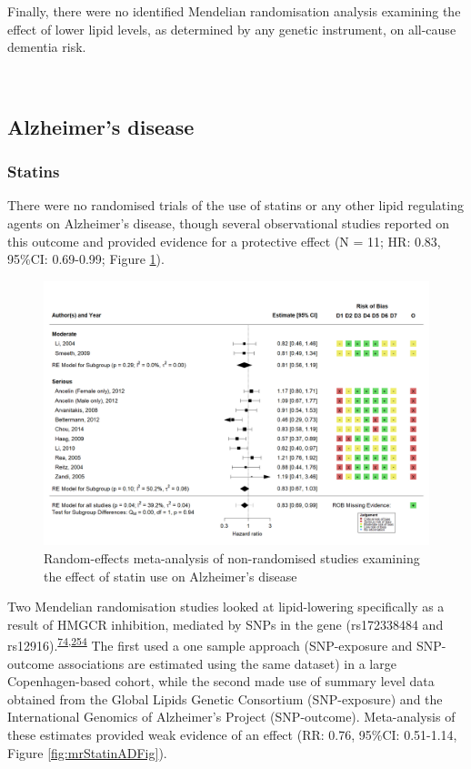 \documentclass[a4paper, twoside]{templates/ociamthesis}
\begin{document}
Finally, there were no identified Mendelian randomisation analysis examining the effect of lower lipid levels, as determined by any genetic instrument, on all-cause dementia risk.

~

\hypertarget{sys-rev-res-AD}{%
\subsection{Alzheimer's disease}\label{sys-rev-res-AD}}

\hypertarget{statins-1}{%
\subsubsection{Statins}\label{statins-1}}

There were no randomised trials of the use of statins or any other lipid regulating agents on Alzheimer's disease, though several observational studies reported on this outcome and provided evidence for a protective effect (N = 11; HR: 0.83, 95\%CI: 0.69-0.99; Figure \ref{fig:obsStatinADFig}).





\begin{figure}[H]
\includegraphics[width=1\linewidth]{figures/sys-rev/fp_obs_Statin-Ever_AD} \caption[Random-effects meta-analysis of statins on Alzheimer's disease]{Random-effects meta-analysis of non-randomised studies examining the effect of statin use on Alzheimer's disease}\label{fig:obsStatinADFig}
\end{figure}

Two Mendelian randomisation studies looked at lipid-lowering specifically as a result of HMGCR inhibition, mediated by SNPs in the gene (rs172338484 and rs12916).\textsuperscript{\protect\hyperlink{ref-benn2017}{74},\protect\hyperlink{ref-so2017}{254}} The first used a one sample approach (SNP-exposure and SNP-outcome associations are estimated using the same dataset) in a large Copenhagen-based cohort, while the second made use of summary level data obtained from the Global Lipids Genetic Consortium (SNP-exposure) and the International Genomics of Alzheimer's Project (SNP-outcome). Meta-analysis of these estimates provided weak evidence of an effect (RR: 0.76, 95\%CI: 0.51-1.14, Figure \ref{fig:mrStatinADFig}).
\end{document}
